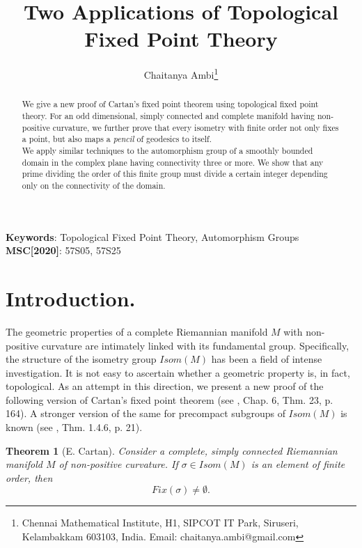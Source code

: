 \documentclass[12pt,a4paper]{article}
\title{Two Applications of Topological Fixed Point Theory}
\author{Chaitanya Ambi\footnote{Chennai Mathematical Institute, H1, SIPCOT IT Park, Siruseri, Kelambakkam 603103, India. \newline Email: chaitanya.ambi@gmail.com}}
\newtheorem{theorem}{Theorem}[section]
\begin{document}
 \maketitle
\begin{abstract}
\indent

We give a new proof of Cartan's fixed point theorem using topological fixed point theory. For an odd dimensional, simply connected and complete manifold having non-positive curvature, we further prove that every isometry with finite order not only fixes a point, but also maps a \textit{pencil} of geodesics to itself.\\

We apply similar techniques to the automorphism group of a smoothly bounded domain in the complex plane having connectivity three or more. We show that any prime dividing the order of this finite group must divide a certain integer depending only on the connectivity of the domain.
\end{abstract}
\textbf{Keywords}: Topological Fixed Point Theory, Automorphism Groups\\
\textbf{MSC[2020]}: 57S05, 57S25
\section{Introduction.}
\indent

    The geometric properties of a complete Riemannian manifold $M$ with non-positive curvature are intimately linked with its fundamental group. Specifically, the structure of the isometry group $Isom(M)$ has been a field of intense investigation. It is not easy to ascertain whether a geometric property is, in fact, topological. As an attempt in this direction, we present a new proof of the following version of Cartan's fixed point theorem (see \cite{petersen}, Chap. 6, Thm. 23, p. 164). A stronger version of the same for precompact subgroups of $Isom(M)$  is known (see \cite{eberlein}, Thm. 1.4.6, p. 21).
\begin{theorem}[E. Cartan]\label{thm-Cartan}
 Consider a complete, simply connected Riemannian manifold $M$ of non-positive curvature. If $\sigma \in Isom(M)$ is an element of finite order, then \begin{equation*}
                                                                                                                                                       Fix(\sigma) \not = \emptyset .
                                                                                                                                                      \end{equation*}

\end{theorem}
\indent
\end{document}
